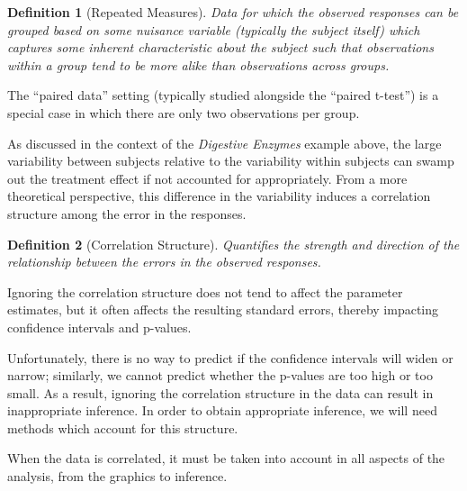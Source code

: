 \documentclass[
]{book}
\theoremstyle{plain}
\theoremstyle{mydefn}
\newtheorem{definition}{Definition}[chapter]
\theoremstyle{myexmpl}
\theoremstyle{remark}
\begin{document}
\begin{definition}[Repeated Measures]
\protect\hypertarget{def:defn-repeated-measures}{}{\label{def:defn-repeated-measures} {} }Data for which the observed responses can be grouped based on some nuisance variable (typically the subject itself) which captures some inherent characteristic about the subject such that observations within a group tend to be more alike than observations across groups.
\end{definition}

\begin{rmdtip}
The ``paired data'' setting (typically studied alongside the ``paired t-test'') is a special case in which there are only two observations per group.
\end{rmdtip}

As discussed in the context of the \emph{Digestive Enzymes} example above, the large variability between subjects relative to the variability within subjects can swamp out the treatment effect if not accounted for appropriately. From a more theoretical perspective, this difference in the variability induces a correlation structure among the error in the responses.

\begin{definition}[Correlation Structure]
\protect\hypertarget{def:defn-correlation-structure}{}{\label{def:defn-correlation-structure} {} }Quantifies the strength and direction of the relationship between the errors in the observed responses.
\end{definition}

\begin{rmdkeyidea}
Ignoring the correlation structure does not tend to affect the parameter estimates, but it often affects the resulting standard errors, thereby impacting confidence intervals and p-values.
\end{rmdkeyidea}

Unfortunately, there is no way to predict if the confidence intervals will widen or narrow; similarly, we cannot predict whether the p-values are too high or too small. As a result, ignoring the correlation structure in the data can result in inappropriate inference. In order to obtain appropriate inference, we will need methods which account for this structure.

\begin{rmdkeyidea}
When the data is correlated, it must be taken into account in all aspects of the analysis, from the graphics to inference.
\end{rmdkeyidea}
\end{document}
